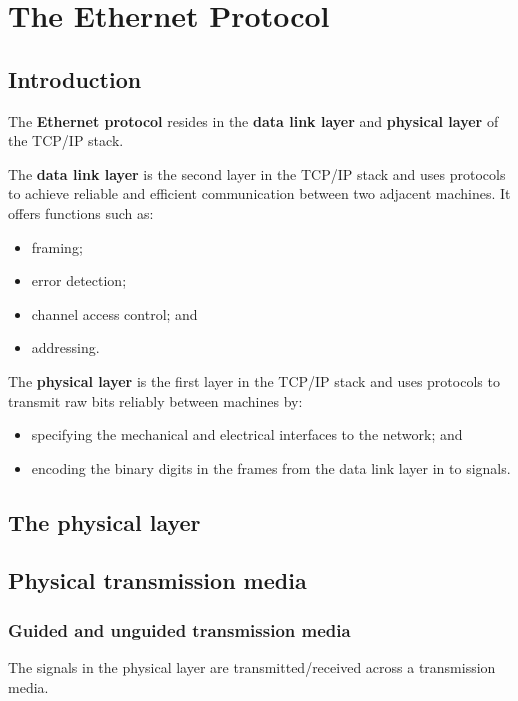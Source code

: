 \documentclass[a4paper]{systems-software}
\begin{document}
\chapter{The Ethernet Protocol}

\section{Introduction}

The \textbf{Ethernet protocol} resides in the \textbf{data link layer} and \textbf{physical layer} of the TCP/IP stack.

The \textbf{data link layer} is the second layer in the TCP/IP stack and uses protocols to achieve reliable and efficient communication between two adjacent machines. It offers functions such as:
\begin{itemize}
	\item framing;
	\item error detection;
	\item channel access control; and
	\item addressing.
\end{itemize}

The \textbf{physical layer} is the first layer in the TCP/IP stack and uses protocols to transmit raw bits reliably between machines by:
\begin{itemize}
	\item specifying the mechanical and electrical interfaces to the network; and
	\item encoding the binary digits in the frames from the data link layer in to signals.
\end{itemize}


\newpage

\section{The physical layer}

\section*{Physical transmission media}

\subsection*{Guided and unguided transmission media}

The signals in the physical layer are transmitted/received across a transmission media.
\end{document}
